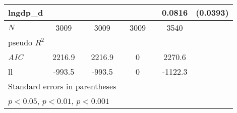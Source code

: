 {\begin{tabular}{l*{4}{cc}}
lngdp\_d   &                  &         &                  &         &                  &         &   0.0816\sym{*}  & (0.0393)\\
\hline
\(N\)     &     3009         &         &     3009         &         &     3009         &         &     3540         &         \\
pseudo \(R^{2}\)&                  &         &                  &         &                  &         &                  &         \\
\textit{AIC}&   2216.9         &         &   2216.9         &         &        0         &         &   2270.6         &         \\
ll        &   -993.5         &         &   -993.5         &         &        0         &         &  -1122.3         &         \\
\hline\hline
\multicolumn{9}{l}{\footnotesize Standard errors in parentheses}\\
\multicolumn{9}{l}{\footnotesize \sym{*} \(p<0.05\), \sym{**} \(p<0.01\), \sym{***} \(p<0.001\)}\\
\end{tabular}
}
